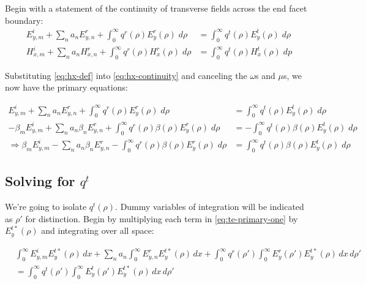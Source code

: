 \documentclass[11pt, oneside]{article}   	%
\begin{document}
Begin with a statement of the continuity of transverse fields across the end facet boundary:
\begin{align}
E_{y,m}^{i} + \sum_{n} a_{n} E_{y,n}^{r} + \int_{0}^{\infty} q^{r}(\rho) E_{y}^{r}(\rho) \; d\rho &= \int_{0}^{\infty} q^{t} (\rho) E_{y}^{t} (\rho) \; d\rho \\
H_{x,m}^{i} + \sum_{n} a_{n} H_{x,n}^{r} + \int_{0}^{\infty} q^{r}(\rho) H_{x}^{r}(\rho) \; d\rho &= \int_{0}^{\infty} q^{t} (\rho) H_{x}^{t} (\rho) \; dp \label{eq:hx-continuity}
\end{align}


\noindent Substituting \eqref{eq:hx-def} into \eqref{eq:hx-continuity} and canceling the $\omega$s and $\mu$s, we now have the primary equations:

\begin{align}
E_{y,m}^{i} + \sum_{n} a_{n} E_{y,n}^{r} + \int_{0}^{\infty} q^{r}(\rho) E_{y}^{r}(\rho) \; d\rho &= \int_{0}^{\infty} q^{t} (\rho) E_{y}^{t} (\rho) \; d\rho \label{eq:te-primary-one}\\
-\beta_{m} E_{y,m}^{i} + \sum_{n} a_{n} \beta_{n} E_{y,n}^{r} + \int_{0}^{\infty} q^{r}(\rho) \beta (\rho) E_{y}^{r}(\rho) \; d\rho &= -\int_{0}^{\infty} q^{t} (\rho) \beta (\rho) E_{y}^{t} (\rho) \; d\rho \\
\Rightarrow \beta_{m} E_{y,m}^{i} - \sum_{n} a_{n} \beta_{n} E_{y,n}^{r} - \int_{0}^{\infty} q^{r}(\rho) \beta (\rho) E_{y}^{r}(\rho) \; d\rho &= \int_{0}^{\infty} q^{t} (\rho) \beta (\rho) E_{y}^{t} (\rho) \; d\rho
\label{eq:te-primary-two}
\end{align} 

\subsection{Solving for $q^{t}$}
\label{sec:qt-te}

We're going to isolate $q^{t}(\rho)$. Dummy variables of integration will be indicated as $\rho '$ for distinction. Begin by multiplying each term in \eqref{eq:te-primary-one} by $ E_{y}^{t*}(\rho)$ and integrating over all space:

\begin{align}
&\int_{0}^{\infty} E_{y,m}^{i} E_{y}^{t*}(\rho) \, dx
+ \sum_{n} a_{n} \int_{0}^{\infty}  E_{y,n}^{r} E_{y}^{t*}(\rho) \, dx 
+ \int_{0}^{\infty} q^{r} (\rho ') \int_{0}^{\infty} E_{y}^{r} (\rho ') E_{y}^{t*} (\rho) \, dx \, d\rho ' \nonumber \\
&= \int_{0}^{\infty} q^{t} (\rho ') \int_{0}^{\infty} E_{y}^{t} (\rho ') E_{y}^{t*} (\rho) \, dx \, d\rho '
\end{align}
\end{document}
